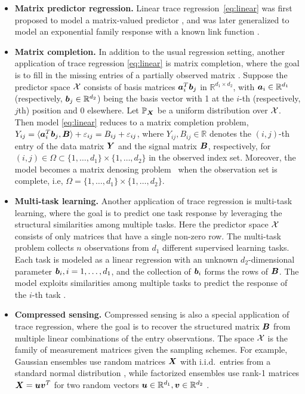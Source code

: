 \documentclass[11pt]{article}
\theoremstyle{plain}
\theoremstyle{definition}
\begin{document}
\begin{itemize}
\item{\bf Matrix predictor regression.} Linear trace regression~\eqref{eq:linear} was first proposed to model a matrix-valued predictor \citep{zhou2014regularized, wang2014network}, and was later generalized to model an exponential family response with a known link function \citep{wang2017generalized, fan2019generalized}. 
\smallskip

\item {\bf Matrix completion.} In addition to the usual regression setting, another application of trace regression \eqref{eq:linear} is matrix completion, where the goal is to fill in the missing entries of a partially observed matrix \citep{Cai2016}. Suppose the predictor space $\mathcal{X}$ consists of basis matrices $\bm{a}^T_i\bm{b}_j$ in $\mathbb{R}^{d_1\times d_2}$, with $\bm{a}_i\in\mathbb{R}^{d_1}$ (respectively, $\bm{b}_j\in\mathbb{R}^{d_2}$) being the basis vector with 1 at the $i$-th (respectively, $j$th) position and 0 elsewhere. Let $\mathbb{P}_{\bm X}$ be a uniform distribution over $\mathcal{X}$. Then model \eqref{eq:linear} reduces to a matrix completion problem, $Y_{ij}=\langle \bm{a}^T_i \bm{b}_j,\bm B \rangle +\varepsilon_{ij}= B_{ij}+\varepsilon_{ij}$, where $Y_{ij}, B_{ij}\in\mathbb{R}$ denotes the $(i,j)$-th entry of the data matrix $\bm Y$ and the signal matrix $\bm B$, respectively, for $(i,j) \in \Omega\subset \{1,\ldots,d_1\}\times\{1,\ldots,d_2\}$ in the observed index set. Moreover, the model becomes a matrix denosing problem~\citep{Ma2016} when the observation set is complete, i.e, $\Omega=\{1,\ldots,d_1\}\times\{1,\ldots,d_2\}$. 
\smallskip

\item {\bf Multi-task learning.} Another application of trace regression is multi-task learning, where the goal is to predict one task response by leveraging the structural similarities among multiple tasks. Here the predictor space $\mathcal{X}$ consists of only matrices that have a single non-zero row. The multi-task problem collects $n$ observations from $d_1$ different supervised learning tasks. Each task is modeled as a linear regression with an unknown $d_2$-dimensional parameter $\bm{b}_i, i=1,\ldots,d_1$, and the collection of $\bm{b}_i$ forms the rows of $\bm B$. The model exploits similarities among multiple tasks to predict the response of the $i$-th task \citep{caruana1997multitask,fan2019generalized}. 
\smallskip

\item {\bf Compressed sensing.} Compressed sensing is also a special application of trace regression, where the goal is to recover the structured matrix $\bm B$ from multiple linear combinations of the entry observations. The space $\mathcal{X}$ is the family of measurement matrices given the sampling schemes. For example, Gaussian ensembles use random matrices $\bm X$ with i.i.d.\ entries from a standard normal distribution \citep{candes2011tight}, while factorized ensembles use rank-1 matrices $\bm X=\bm{u}\bm{v}^T$ for two random vectors $\bm{u}\in\mathbb{R}^{d_1}, \bm{v}\in\mathbb{R}^{d_2}$ \citep{recht2010guaranteed}.
\end{itemize}
\end{document}
